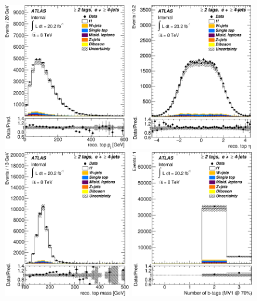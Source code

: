\begin{figure}[!h]
\begin{center}
		\includegraphics[height=65mm]{chapters/whel/figures/control_Plots2/bTag_2incl/reco_Top_pt_el}
		\includegraphics[height=65mm]{chapters/whel/figures/control_Plots2/bTag_2incl/reco_Top_eta_el}\\
		\includegraphics[height=65mm]{chapters/whel/figures/control_Plots2/bTag_2incl/reco_Top_m_el}
		\includegraphics[height=65mm]{chapters/whel/figures/control_Plots2/bTag_2incl/NumberBtags_el}\\

\end{center}
\end{figure}
